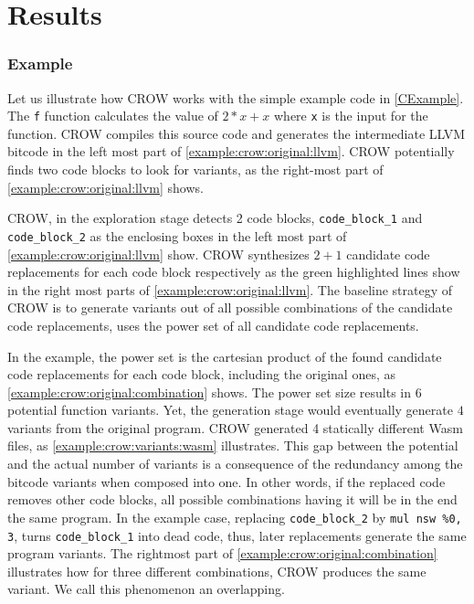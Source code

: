 \chapter{Results} 



\newcommand{\diversifiedsodium}{85}
\newcommand{\diversifiedqrcode}{32}
\newcommand{\libpopulation}{4272}
\newcommand{\qrpopulation}{6369}


\newcommand{\allmewediversified}{\diversifiedsodium + \diversifiedqrcode}
\newcommand{\allmewepopulation}{\libpopulation + \qrpopulation}

\subsection{Example}
\label{section:crow:example}
 Let us illustrate how CROW works with the simple example code in \autoref{CExample}. The \texttt{f} function calculates the value of $2 * x + x$ where \texttt{x} is the input for the function.  CROW compiles this source code and generates the intermediate LLVM bitcode in the left most part of \autoref{example:crow:original:llvm}. CROW potentially finds two code blocks to look for variants, as the right-most part of \autoref{example:crow:original:llvm} shows.


    

CROW, in the exploration stage detects 2 code blocks, \texttt{code\_block\_1} and \texttt{code\_block\_2} as the enclosing boxes in the left most part of \autoref{example:crow:original:llvm} show. CROW synthesizes $2 + 1$ candidate code replacements for each code block respectively as the green highlighted lines show in the right most parts of \autoref{example:crow:original:llvm}.
The baseline strategy of CROW is to generate variants out of all possible combinations of the candidate code replacements, \ie uses the power set of all candidate code replacements.

In the example, the power set is the cartesian product of the found candidate code replacements for each code block, including the original ones, as \autoref{example:crow:original:combination} shows. The power set size results in $6$ potential function variants. Yet, the generation stage would eventually generate $4$ variants from the original program. CROW generated 4 statically different Wasm files, as \autoref{example:crow:variants:wasm} illustrates. This gap between the potential and the actual number of variants is a consequence of the redundancy among the bitcode variants when composed into one. In other words, if the replaced code removes other code blocks, all possible combinations having it will be in the end the same program. In the example case, replacing \texttt{code\_block\_2} by \texttt{mul nsw \%0, 3}, turns \texttt{code\_block\_1} into dead code, thus, later replacements generate the same program variants. The rightmost part of \autoref{example:crow:original:combination} illustrates how for three different combinations, CROW produces the same variant. We call this phenomenon an overlapping.

